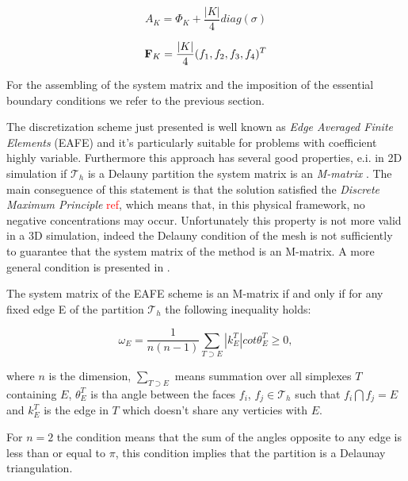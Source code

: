 \begin{equation}
\label{eq: matrice continuità}
A_K = \Phi_K + \dfrac{|K|}{4} diag (\sigma)
\end{equation}

\begin{equation}
\mathbf{F}_K = \dfrac{|K|}{4} (f_1,f_2,f_3,f_4)^T
\end{equation}

For the assembling of the system matrix and the imposition of the essential boundary conditions we refer to the previous section.

The discretization scheme just presented is well known as \textit{Edge Averaged Finite Elements} (EAFE) and it's particularly suitable for problems with coefficient highly variable. Furthermore this approach has several good properties, e.i. in 2D simulation if $\mathcal{T}_h$ is a Delauny partition the system matrix is an \textit{M-matrix} \cite{BankMmatrixEAFE}. The main conseguence of this statement is that the solution satisfied the \textit{Discrete Maximum Principle} \textcolor{red}{ref}, which means that, in this physical framework, no negative concentrations may occur. Unfortunately this property is not more valid in a 3D simulation, indeed the Delauny condition of the mesh is not sufficiently to guarantee that the system matrix of the method is an M-matrix. A more general condition is presented in \cite{ZikatanovXu}.

\begin{Teorema}
The system matrix of the EAFE scheme is an M-matrix if and only if for any fixed edge E of the partition $\mathcal{T}_h$ the following inequality holds:

\begin{equation}
\label{eq: mesh delaunay condition}
\omega_E = \dfrac{1}{n(n-1)} \sum_{T\supset E} |k_E^T|cot\theta_E^T \geq 0,
\end{equation}

where $n$ is the dimension, $\sum_{T \supset E}$ means summation over all simplexes $T$ containing $E$, $\theta_E^T$ is tha angle between the faces $f_i$, $f_j \in \mathcal{T}_h$ such that $f_i \bigcap f_j = E$  and $k_E^T$ is the edge in $T$ which doesn't share any verticies with $E$.
\end{Teorema}

\begin{Osservazione}
For $n=2$ the condition  means that the sum of the angles opposite to any edge is less than or equal to $\pi$, this condition implies that the partition is a Delaunay triangulation.
\end{Osservazione}

